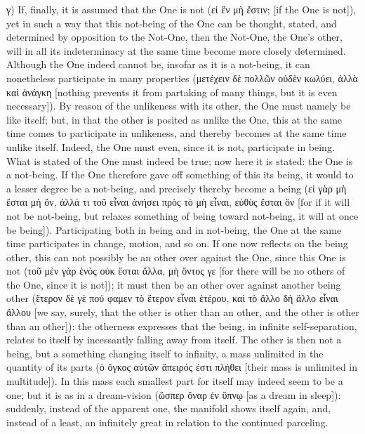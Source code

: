 \documentclass[12pt]{book}
\begin{document}
γ) If, finally, it is assumed that the One is not (εἰ ἓν μὴ ἔστιν; [if the One is not]), yet in such
a way that this not-being of the One can be thought, stated, and determined by opposition to the
Not-One, then
the Not-One, the One's other, will in all its indeterminacy at the same time become more closely
determined. Although the One indeed cannot be, insofar as it is a not-being, it can nonetheless
participate in many properties (μετέχειν δὲ πολλῶν οὐδὲν κωλύει, ἀλλὰ καὶ ἀνάγκη [nothing prevents
it from partaking of many things, but it is even necessary]). By reason of the unlikeness with its
other, the One must namely be like itself; but, in that the other is posited as unlike the One, this
at the same time comes to participate in unlikeness, and thereby becomes at the same time unlike
itself. Indeed, the One must even, since it is not, participate in being. What is stated of the One
must indeed be true; now here it is stated: the One is a not-being. If the One therefore gave off
something of this its being, it would to a lesser degree be a not-being, and precisely thereby
become a being (εἰ γὰρ μὴ ἔσται μὴ ὄν, ἀλλά τι τοῦ εἶναι ἀνήσει πρὸς τὸ μὴ εἶναι, εὐθὺς ἔσται ὄν [for
if it will not be not-being, but relaxes something of being toward not-being, it will at once be
being]). Participating both in being and in not-being, the One at the same time participates in
change, motion, and so on. If one now reflects on the being other, this can not possibly be an other
over against the One, since this One is not (τοῦ μὲν γὰρ ἑνὸς οὐκ ἔσται ἄλλα, μὴ ὄντος γε [for there
will be no others of the One, since it is not]); it must then be an other over against another being
other (ἕτερον δὲ γὲ πού φαμεν τὸ ἕτερον εἶναι ἑτέρου, καὶ τὸ ἄλλο δὴ ἄλλο εἶναι ἄλλου [we say,
surely, that the other is other than an other, and the other is other than an other]): the otherness
expresses that the being, in infinite self-separation, relates to itself by incessantly falling away
from itself. The other is then not a being, but a something changing itself to infinity, a mass
unlimited in the quantity of its parts (ὁ ὄγκος αὐτῶν ἄπειρός ἐστι πλήθει [their mass is unlimited in
multitude]). In this mass each smallest part for itself may indeed seem to be a one; but it is as in
a dream-vision (ὥσπερ ὄναρ ἐν ὕπνῳ [as a dream in sleep]): suddenly, instead of the apparent one, the
manifold shows itself again, and, instead of a least, an infinitely great in relation to the
continued parceling.
\end{document}
